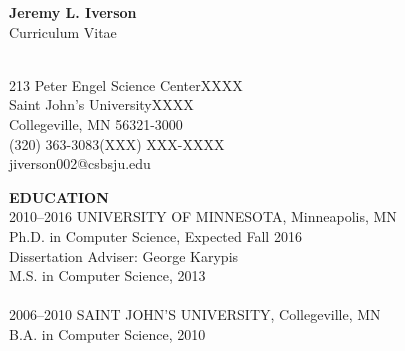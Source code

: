 \documentclass[a4paper,12pt]{article}
\newcommand{\lskip}[1]{\hspace*{1em}\\[#1\baselineskip]}
\begin{document}
\begin{center}
{\large\textbf{Jeremy L. Iverson}}\\
Curriculum Vitae\\
\end{center}
%
\lskip{-3}
%
213 Peter Engel Science Center\hfill XXXX\\
Saint John's University\hfill XXXX\\
Collegeville, MN 56321-3000\hfill\\
(320) 363-3083\hfill (XXX) XXX-XXXX\\
jiverson002@csbsju.edu


\textbf{EDUCATION}
\lskip{1}
%
2010--2016  \tabto{7em}UNIVERSITY OF MINNESOTA, Minneapolis, MN\\
            \tabto{7em}Ph.D. in Computer Science, Expected Fall 2016\\
            \tabto{8em}Dissertation Adviser: George Karypis\\
            \tabto{7em}M.S. in Computer Science, 2013\\
%
\lskip{0}
%
2006--2010  \tabto{7em}SAINT JOHN'S UNIVERSITY, Collegeville, MN\\
            \tabto{7em}B.A. in Computer Science, 2010
\end{document}
